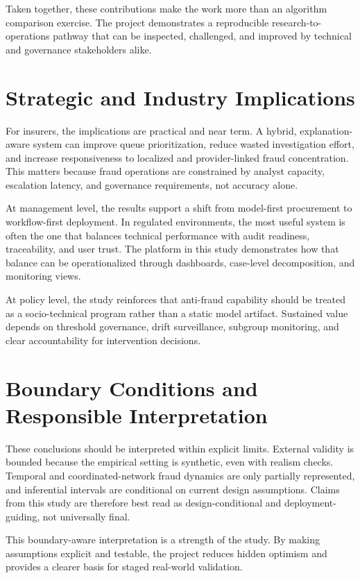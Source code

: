 \documentclass[12pt,a4paper]{report}
\begin{document}
Taken together, these contributions make the work more than an algorithm comparison exercise. The project demonstrates a reproducible research-to-operations pathway that can be inspected, challenged, and improved by technical and governance stakeholders alike.

\section{Strategic and Industry Implications}
For insurers, the implications are practical and near term. A hybrid, explanation-aware system can improve queue prioritization, reduce wasted investigation effort, and increase responsiveness to localized and provider-linked fraud concentration. This matters because fraud operations are constrained by analyst capacity, escalation latency, and governance requirements, not accuracy alone.

At management level, the results support a shift from model-first procurement to workflow-first deployment. In regulated environments, the most useful system is often the one that balances technical performance with audit readiness, traceability, and user trust. The platform in this study demonstrates how that balance can be operationalized through dashboards, case-level decomposition, and monitoring views.

At policy level, the study reinforces that anti-fraud capability should be treated as a socio-technical program rather than a static model artifact. Sustained value depends on threshold governance, drift surveillance, subgroup monitoring, and clear accountability for intervention decisions.

\section{Boundary Conditions and Responsible Interpretation}
These conclusions should be interpreted within explicit limits. External validity is bounded because the empirical setting is synthetic, even with realism checks. Temporal and coordinated-network fraud dynamics are only partially represented, and inferential intervals are conditional on current design assumptions. Claims from this study are therefore best read as design-conditional and deployment-guiding, not universally final.

This boundary-aware interpretation is a strength of the study. By making assumptions explicit and testable, the project reduces hidden optimism and provides a clearer basis for staged real-world validation.
\end{document}
